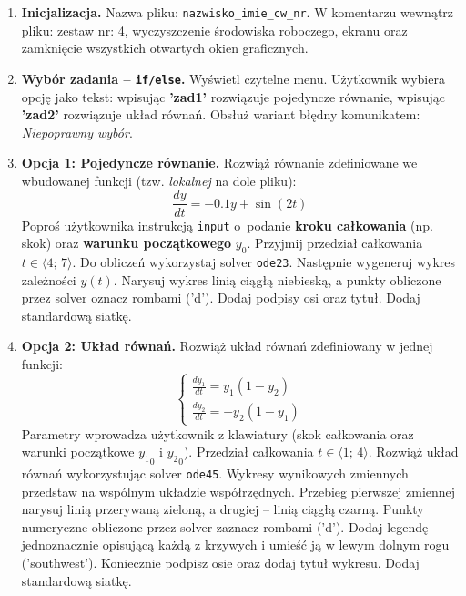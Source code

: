 \documentclass[a4paper,11pt]{article}
\begin{document}
\begin{enumerate}[leftmargin=*, label=\textbf{\arabic*.}, itemsep=2pt]

  \item \textbf{Inicjalizacja.}
    Nazwa pliku: \texttt{nazwisko\_imie\_cw\_nr}. W komentarzu wewnątrz pliku: zestaw nr: 4, wyczyszczenie środowiska roboczego, ekranu oraz zamknięcie wszystkich otwartych okien graficznych.

  \item \textbf{Wybór zadania -- \texttt{if/else}.}
    Wyświetl czytelne menu. Użytkownik wybiera opcję jako tekst: wpisując \textbf{'zad1'} rozwiązuje pojedyncze równanie, wpisując \textbf{'zad2'} rozwiązuje układ równań. Obsłuż wariant błędny komunikatem: \textit{Niepoprawny wybór}.

  \item \textbf{Opcja 1: Pojedyncze równanie.}
    Rozwiąż równanie zdefiniowane we wbudowanej funkcji (tzw. \textit{lokalnej} na dole pliku):
    \[ \frac{dy}{dt} = -0.1y + \sin(2t) \]
    Poproś użytkownika instrukcją \texttt{input} o~podanie \textbf{kroku całkowania} (np. skok) oraz \textbf{warunku początkowego} $y_0$. Przyjmij przedział całkowania $t \in \langle 4;\,7 \rangle$.
    Do obliczeń wykorzystaj solver \texttt{ode23}. Następnie wygeneruj wykres zależności $y(t)$. Narysuj wykres linią ciągłą niebieską, a punkty obliczone przez solver oznacz rombami ('d'). Dodaj podpisy osi oraz tytuł. Dodaj standardową siatkę.

  \item \textbf{Opcja 2: Układ równań.}
    Rozwiąż układ równań zdefiniowany w jednej funkcji:\\[-0.5em]
    \[
    \begin{cases}
      \frac{dy_1}{dt} = y_1(1 - y_2) \\
      \frac{dy_2}{dt} = -y_2(1 - y_1)
    \end{cases}
    \]
    Parametry wprowadza użytkownik z klawiatury (skok całkowania oraz warunki początkowe $ {y_1}_{0} $ i $ {y_2}_{0} $). Przedział całkowania $t \in \langle 1;\,4 \rangle$.
    Rozwiąż układ równań wykorzystując solver \texttt{ode45}. Wykresy wynikowych zmiennych przedstaw na wspólnym układzie współrzędnych. Przebieg pierwszej zmiennej narysuj linią przerywaną zieloną, a drugiej -- linią ciągłą czarną. Punkty numeryczne obliczone przez solver zaznacz rombami ('d'). Dodaj legendę jednoznacznie opisującą każdą z krzywych i umieść ją w lewym dolnym rogu ('southwest'). Koniecznie podpisz osie oraz dodaj tytuł wykresu. Dodaj standardową siatkę.

\end{enumerate}
\end{document}

